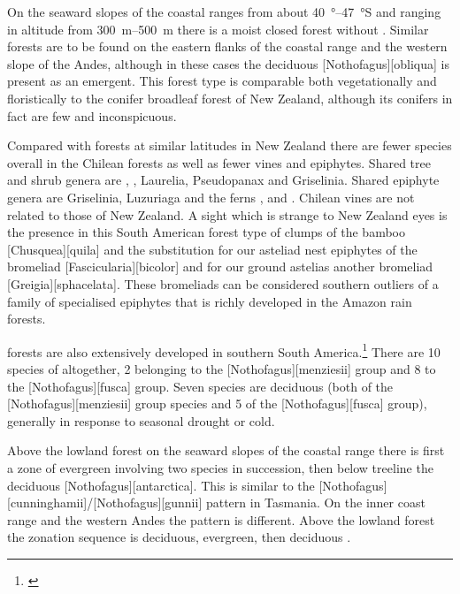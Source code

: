 On the seaward slopes of the coastal ranges from about \SIrange{40}{47}{\degree}S and ranging in altitude from \SIrange{300}{500}{\metre} there is a moist closed forest without .
Similar forests are to be found on the eastern flanks of the coastal range and the western slope of the Andes, although in these cases the deciduous [Nothofagus][obliqua] is present as an emergent.
This forest type is comparable both vegetationally and floristically to the conifer broadleaf forest of New Zealand, although its conifers in fact are few and inconspicuous.

Compared with forests at similar latitudes in New Zealand there are fewer species overall in the Chilean forests as well as fewer vines and epiphytes.
Shared tree and shrub genera are , , Laurelia, Pseudopanax and Griselinia.
Shared epiphyte genera are Griselinia, Luzuriaga and the ferns ,  and .
Chilean vines are not related to those of New Zealand.
A sight which is strange to New Zealand eyes is the presence in this South American forest type of clumps of the bamboo [Chusquea][quila] and the substitution for our asteliad nest epiphytes of the bromeliad [Fascicularia][bicolor] and for our ground astelias another bromeliad [Greigia][sphacelata].
These bromeliads can be considered southern outliers of a family of specialised epiphytes that is richly developed in the Amazon rain forests.

 forests are also extensively developed in southern South America.\footnote{\cite{mcqueen1976ecology}}
There are 10 species of  altogether, 2 belonging to the [Nothofagus][menziesii] group and 8 to the [Nothofagus][fusca] group.
Seven species are deciduous (both of the [Nothofagus][menziesii] group species and 5 of the [Nothofagus][fusca] group), generally in response to seasonal drought or cold.

Above the lowland forest on the seaward slopes of the coastal range there is first a zone of evergreen  involving two species in succession, then below treeline the deciduous [Nothofagus][antarctica].
This is similar to the [Nothofagus][cunninghamii]/[Nothofagus][gunnii] pattern in Tasmania.
On the inner coast range and the western Andes the pattern is different.
Above the lowland forest the zonation sequence is deciduous, evergreen, then deciduous .

